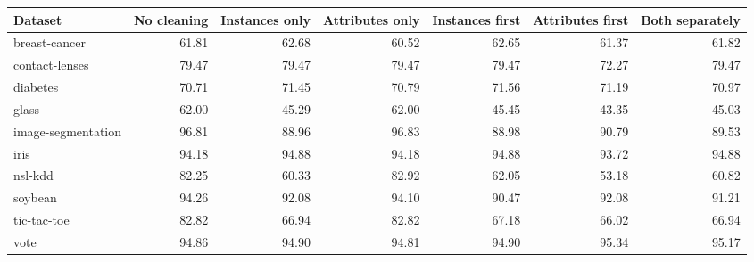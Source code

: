 \begin{tabular}{lrrrrrr}
\toprule
Dataset & No cleaning & Instances only & Attributes only & Instances first & Attributes first & Both separately \\
\midrule
breast-cancer & 61.81 & 62.68 & 60.52 & 62.65 & 61.37 & 61.82 \\
contact-lenses & 79.47 & 79.47 & 79.47 & 79.47 & 72.27 & 79.47 \\
diabetes & 70.71 & 71.45 & 70.79 & 71.56 & 71.19 & 70.97 \\
glass & 62.00 & 45.29 & 62.00 & 45.45 & 43.35 & 45.03 \\
image-segmentation & 96.81 & 88.96 & 96.83 & 88.98 & 90.79 & 89.53 \\
iris & 94.18 & 94.88 & 94.18 & 94.88 & 93.72 & 94.88 \\
nsl-kdd & 82.25 & 60.33 & 82.92 & 62.05 & 53.18 & 60.82 \\
soybean & 94.26 & 92.08 & 94.10 & 90.47 & 92.08 & 91.21 \\
tic-tac-toe & 82.82 & 66.94 & 82.82 & 67.18 & 66.02 & 66.94 \\
vote & 94.86 & 94.90 & 94.81 & 94.90 & 95.34 & 95.17 \\
\bottomrule
\end{tabular}
